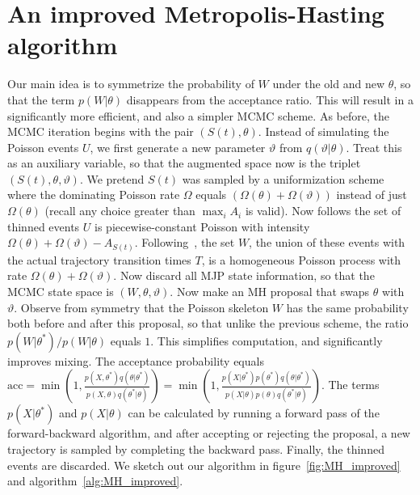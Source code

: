 
\section{An improved Metropolis-Hasting algorithm}
Our main idea is to symmetrize the probability of $W$ under the old and new 
$\theta$, so that the term
$p(W|\theta)$ disappears from the acceptance ratio. This will result
in a significantly more efficient, and also a simpler MCMC scheme.
As before, the MCMC iteration begins with the pair $(S(t), \theta)$. 
Instead of simulating the Poisson events $U$, we first generate a new 
parameter $\vartheta$ from $q(\vartheta|\theta)$. Treat this as an 
auxiliary variable, so that the augmented space now is the triplet 
$(S(t), \theta,\vartheta)$. We pretend $S(t)$ was sampled by a 
uniformization scheme where the dominating Poisson rate $\Omega$ equals 
$(\Omega(\theta) + \Omega(\vartheta))$ instead of just $\Omega(\theta)$ 
(recall any choice greater than $\max_i A_i$ is valid).
Now follows the set of thinned events $U$ is piecewise-constant
Poisson with intensity $\Omega(\theta) + \Omega(\vartheta) - 
A_{S(t)}$. Following~\cite{RaoTeh13}, the set $W$, the union of these events 
with the actual
trajectory transition times $T$, is a homogeneous Poisson process with 
rate $\Omega(\theta) + \Omega(\vartheta)$. Now discard all MJP 
state information, so that the MCMC state space is $(W, \theta, \vartheta)$.
Now make an MH proposal that swaps $\theta$ with $\vartheta$. 
Observe from
symmetry that the Poisson skeleton $W$ has the same probability both
before and after this proposal, so that unlike the previous scheme,
the ratio $p(W|\theta^*)/p(W|\theta)$ equals $1$.  This simplifies 
computation, and significantly improves mixing.
The acceptance probability 
equals
$ \text{acc} = 
  \min\left(1, \frac{p(X,\theta^*)q(\theta|\theta^*)}
   {p(X,\theta)q(\theta^*|\theta)}\right) = 
  \min\left(1, \frac{p(X|\theta^*)p(\theta^*)q(\theta|\theta^*)}
   {p(X|\theta)p(\theta)q(\theta^*|\theta)}\right).
   $
   The terms $p(X|\theta^*)$ and  $p(X|\theta)$ can be calculated by 
   running a forward pass of the forward-backward algorithm, and after
   accepting or rejecting the proposal, a new trajectory is sampled by
   completing the backward pass. Finally, the thinned events are
   discarded. We sketch out our algorithm in 
   figure~\ref{fig:MH_improved} and algorithm~\ref{alg:MH_improved}.
